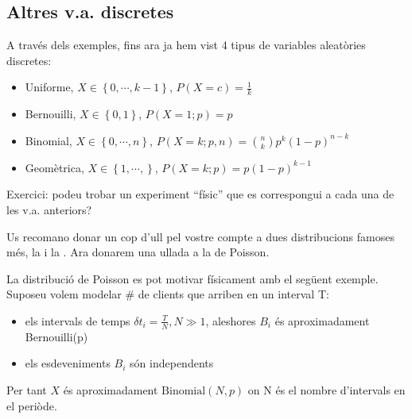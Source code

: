 \documentclass[letterpaper,10pt,english]{sphinxmanual}
\let\sphinxpxdimen\pdfpxdimen\else\newdimen\sphinxpxdimen
\begin{document}
\subsection{Altres v.a. discretes}
\label{\detokenize{0_Intro/0_1_Repas_probabilitat:altres-v-a-discretes}}
A través dels exemples, fins ara ja hem vist 4 tipus de variables aleatòries discretes:
\begin{itemize}
\item {} 
Uniforme, \(X \in \left\{0, \cdots, k-1\right\}\), \(P\left(X = c \right)=\frac{1}{k}\)

\item {} 
Bernouilli, \(X \in \left\{0, 1\right\}\), \(P\left(X = 1; p \right)=p\)

\item {} 
Binomial, \(X \in \left\{0, \cdots, n\right\}\), \(P\left(X = k; p, n \right)={n\choose k}p^k\left(1-p\right)^{n-k}\)

\item {} 
Geomètrica, \(X \in \left\{1, \cdots,\right\}\), \(P\left(X = k; p \right)= p\left(1-p\right)^{k-1}\)

\end{itemize}

Exercici: podeu trobar un experiment “físic” que es correspongui a cada una de les v.a. anteriors?

Us recomano donar un cop d’ull pel vostre compte a dues distribucions famoses més,
la  i la . Ara donarem una ullada a la de Poisson.

La distribució de Poisson es pot motivar físicament amb el següent exemple. Suposeu volem modelar \# de clients que arriben en un interval T:

\begin{figure}[htbp]
\centering

\noindent\sphinxincludegraphics[height=300\sphinxpxdimen]{{poisson_motivation}.png}
\end{figure}
\begin{itemize}
\item {} 
els intervals de temps \(\delta t_i = \frac{T}{N}, N \gg 1\), aleshores \(B_i\) és aproximadament Bernouilli(p)

\item {} 
els esdeveniments \(B_i\) són independents

\end{itemize}

Per tant \(X\) és aproximadament \(\mbox{Binomial}\left(N, p\right)\) on N és el nombre d’intervals en el periòde.
\end{document}
